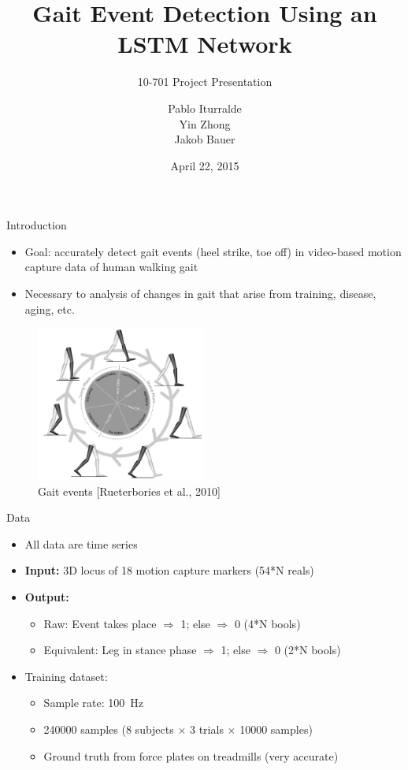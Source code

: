 \documentclass{beamer}
\title
{
    Gait Event Detection Using an LSTM Network
}
\subtitle
{
    10-701
    Project Presentation
}
\author
{
    Pablo Iturralde\\
    Yin Zhong\\
    Jakob Bauer
}
\date
{
    April 22, 2015
}
\begin{document}
\begin{frame}
  \titlepage
\end{frame}

\begin{frame}{Introduction}
    \begin{itemize}
        \item
            Goal: accurately detect gait events (heel strike, toe off) 
            in video-based motion capture data of human walking gait
        \item
            Necessary to analysis of changes in gait that arise from training,
            disease, aging, etc.
    \end{itemize}
    \begin{figure}
    \begin{center}
        \includegraphics[width=0.5\textwidth]{figures/gait_events.jpg}
        \caption{Gait events [Rueterbories et al., 2010]}
    \end{center}
    \end{figure}
\end{frame}

\begin{frame}{Data}
    \begin{itemize}
        \item All data are time series
        \item \textbf{Input:} 3D locus of 18 motion capture markers (54*N reals)
        \item \textbf{Output:}
        \begin{itemize}
            \item Raw: Event takes place $\Rightarrow$ 1; else $\Rightarrow$ 0 (4*N bools)
            \item Equivalent: Leg in stance phase $\Rightarrow$ 1; else $\Rightarrow$ 0 (2*N bools)
        \end{itemize}
        \item Training dataset:
        \begin{itemize}
            \item Sample rate: \SI{100}{\Hz}
            \item
                \num{240000} samples
                (8 subjects $\times$ 3 trials $\times$ \num{10000} samples)
            \item
                Ground truth from force plates on treadmills (very accurate)
        \end{itemize}
    \end{itemize}
\end{frame}
\end{document}
